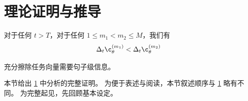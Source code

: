 



\section{理论证明与推导}\label{sec:theory}

\begin{theorem}\label{thm:1}
    对于任何 $t > T$，对于任何 $1 \leq m_1 < m_2 \leq M$，我们有
    \begin{equation}
        \Delta_t  \c_{\theta}^{(m_1)} <  \Delta_t \c_{\theta}^{(m_2)}
    \end{equation}
\end{theorem}

\begin{theorem}\label{thm:2}
    充分擦除任务向量需要句子级信息。
\end{theorem}

本节给出 \cref{sec:theory} 中分析的完整证明。
为便于表述与阅读，本节叙述顺序与 \cref{sec:theory} 略有不同。
为完整起见，先回顾基本设定。

